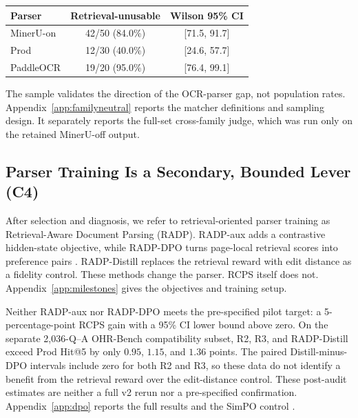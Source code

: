 \documentclass[11pt]{article}
\newcommand{\rcps}{\textnormal{\textsc{RCPS}}}
\newcommand{\contribTraining}{C4}
\begin{document}
\begin{center}
\begin{minipage}{\columnwidth}
\centering\footnotesize
\setlength{\tabcolsep}{5pt}
\begin{tabular}{lcc}
\toprule
Parser & Retrieval-unusable & Wilson 95\% CI \\
\midrule
MinerU-on & 42/50 (84.0\%) & [71.5, 91.7] \\
Prod & 12/30 (40.0\%) & [24.6, 57.7] \\
PaddleOCR & 19/20 (95.0\%) & [76.4, 99.1] \\
\bottomrule
\end{tabular}
\label{tab:human-main}
\end{minipage}
\end{center}

The sample validates the direction of the OCR-parser gap, not population rates. Appendix~\ref{app:familyneutral} reports the matcher definitions and sampling design. It separately reports the full-set cross-family judge, which was run only on the retained MinerU-off output.

\subsection{Parser Training Is a Secondary, Bounded Lever (\contribTraining)}
\label{sec:c4}\label{sec:mechanism}

After selection and diagnosis, we refer to retrieval-oriented parser training as Retrieval-Aware Document Parsing (RADP). RADP-aux adds a contrastive hidden-state objective, while RADP-DPO turns page-local retrieval scores into preference pairs \citep{rafailov2023dpo}. RADP-Distill replaces the retrieval reward with edit distance as a fidelity control. These methods change the parser. \rcps{} itself does not. Appendix~\ref{app:milestones} gives the objectives and training setup.

Neither RADP-aux nor RADP-DPO meets the pre-specified pilot target: a 5-percentage-point \rcps{} gain with a 95\% CI lower bound above zero. On the separate 2{,}036-Q--A OHR-Bench compatibility subset, R2, R3, and RADP-Distill exceed Prod Hit@5 by only $0.95$, $1.15$, and $1.36$ points. The paired Distill-minus-DPO intervals include zero for both R2 and R3, so these data do not identify a benefit from the retrieval reward over the edit-distance control. These post-audit estimates are neither a full v2 rerun nor a pre-specified confirmation. Appendix~\ref{app:dpo} reports the full results and the SimPO control \citep{meng2024simpo}.
\end{document}

